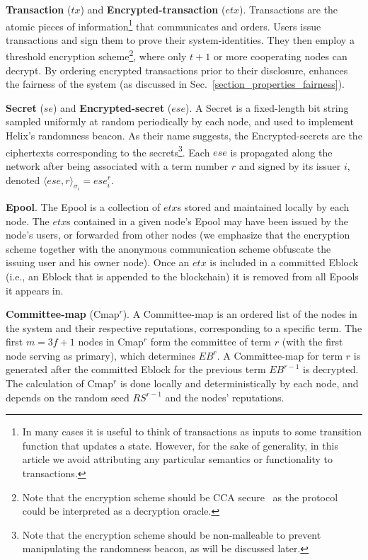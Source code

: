 \noindent \textbf{Transaction} ($tx$) and \textbf{Encrypted-transaction} ($etx$).
Transactions are the atomic pieces of information\footnote{In many cases it is useful to think of transactions as inputs to some transition function that updates a state. However, for the sake of generality, in this article we avoid attributing any particular semantics or functionality to transactions.} that \name communicates and orders. Users issue transactions and sign them to prove their system-identities. 
They then employ a threshold encryption scheme\footnote{Note that the encryption scheme should be CCA secure~\cite{CCA} as the protocol could be interpreted as a decryption oracle.}, where only $t+1$ or more cooperating nodes can decrypt. By ordering encrypted transactions prior to their disclosure, \name enhances the fairness of the system (as discussed in Sec.~\ref{section_properties_fairness}).

\textbf{Secret} ($se$) and \textbf{Encrypted-secret} ($ese$).
A Secret is a fixed-length bit string sampled uniformly at random periodically by each node, and used to implement Helix's randomness beacon.  
As their name suggests, the Encrypted-secrets are the ciphertexts corresponding to the secrets\footnote{Note that the encryption scheme should be non-malleable to prevent manipulating the randomness beacon, as will be discussed later.}. Each $ese$ is propagated along the network after being associated with a term number $r$ and signed by its issuer $i$, denoted $\langle ese, r \rangle_{\sigma_i} = ese^r_i$.

\textbf{Epool}.
The Epool is a collection of $etx$s stored and maintained locally by each node. The $etx$s contained in a given node’s Epool may have been issued by the node's users, or forwarded from other nodes (we emphasize that the encryption scheme together with the anonymous communication scheme obfuscate the issuing user and his owner node). Once an $etx$ is included in a committed Eblock (i.e., an Eblock that is appended to the blockchain) it is removed from all Epools it appears in.

\textbf{Committee-map} (Cmap$^r$).
A Committee-map is an ordered list of the nodes in the system and their respective reputations, corresponding to a specific term. The first $m=3f+1$ nodes in Cmap$^r$ form the committee of term $r$ (with the first node serving as primary), which determines $EB^r$. A Committee-map for term $r$ is generated after the committed Eblock for the previous term $EB^{r-1}$ is decrypted.
The calculation of Cmap$^r$ is done locally and deterministically by each node, and depends on the random seed $RS^{r-1}$ and the nodes' reputations.

